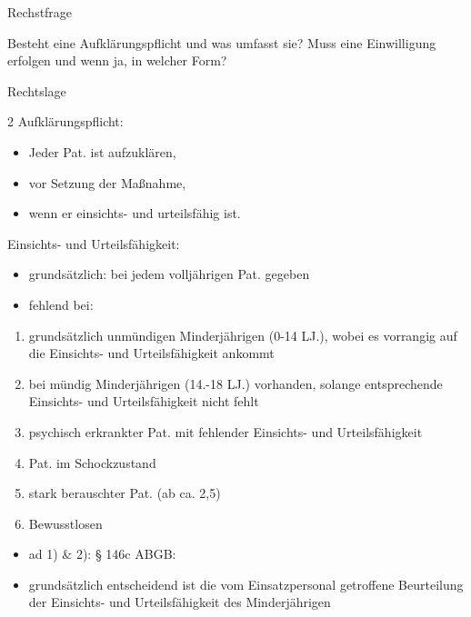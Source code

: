 \documentclass{article}
\begin{document}
Rechstfrage

Besteht eine Aufkl\"arungspflicht und was umfasst sie? Muss eine
Einwilligung erfolgen und wenn ja, in welcher Form?

Rechtslage

\begin{multicols}{2}
Aufkl\"arungspflicht:

\begin{itemize}
\item Jeder Pat. ist aufzukl\"aren,

\item vor Setzung der Ma{\ss}nahme,

\item wenn er einsichts- und urteilsf\"ahig ist.

\end{itemize}
Einsichts- und Urteilsf\"ahigkeit:

\begin{itemize}
\item grunds\"atzlich: bei jedem vollj\"ahrigen Pat. gegeben 

\item fehlend bei: 

\end{itemize}
\begin{enumerate}
\item grunds\"atzlich unm\"undigen Minderj\"ahrigen (0-14 LJ.), wobei es
vorrangig auf die Einsichts- und Urteilsf\"ahigkeit ankommt

\item bei m\"undig Minderj\"ahrigen (14.-18 LJ.) vorhanden, solange
entsprechende Einsichts- und Urteilsf\"ahigkeit nicht fehlt

\item psychisch erkrankter Pat. mit fehlender Einsichts- und
Urteilsf\"ahigkeit

\item Pat. im Schockzustand

\item stark berauschter Pat. (ab ca. 2,5{\textperthousand})

\item Bewusstlosen

\end{enumerate}
\begin{itemize}
\item[] ad 1) \& 2): {\S} 146c ABGB:

\end{itemize}
\begin{itemize}
\item grunds\"atzlich entscheidend ist die vom Einsatzpersonal
getroffene Beurteilung der Einsichts- und Urteilsf\"ahigkeit des
Minderj\"ahrigen


\end{itemize}
\end{multicols}
\end{document}
